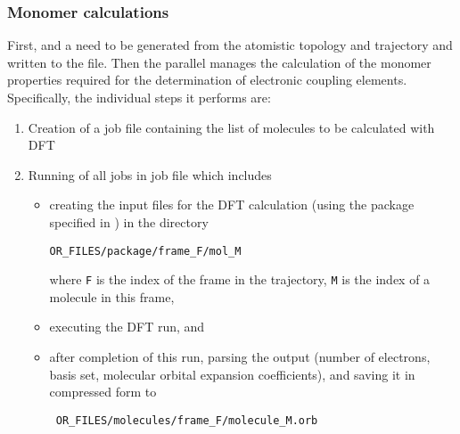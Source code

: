 \subsubsection{Monomer calculations}
\label{sec:edft}
First,  and a 
 need to be generated from the atomistic 
topology and trajectory and written to the \sqlstate file. Then the parallel 
 \calculator manages the calculation of the monomer properties 
required for the determination of electronic coupling elements. Specifically, 
the individual steps it performs are:
%
\begin{enumerate}
\item Creation of a job file containing the list of molecules to be calculated 
with DFT 
\item Running of all jobs in job file 
which includes
\begin{itemize}
\item creating the input files for the DFT calculation (using the package 
specified in \xmloptions) in the directory 
\begin{verbatim}
OR_FILES/package/frame_F/mol_M
\end{verbatim}
where {\tt F} is the index of the frame in the trajectory, {\tt M} is the index 
of a molecule in this frame,
\item executing the DFT run, and
\item after completion of this run, parsing the output (number of electrons, 
basis set, molecular orbital expansion coefficients), and saving it in 
compressed form to 
\begin{verbatim}
 OR_FILES/molecules/frame_F/molecule_M.orb 
\end{verbatim}
\end{itemize}
\end{enumerate}


